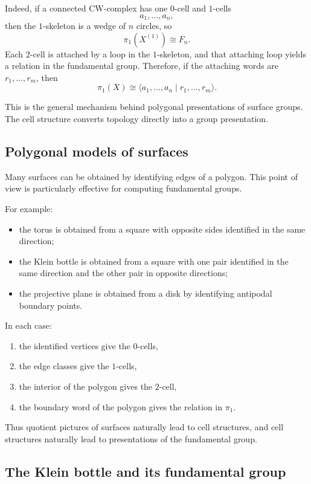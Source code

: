 \documentclass[12pt,a4paper]{article}
\theoremstyle{notespace}
\begin{document}
Indeed, if a connected CW-complex has one \(0\)-cell and \(1\)-cells
\[
a_1,\dots,a_n,
\]
then the \(1\)-skeleton is a wedge of \(n\) circles, so
\[
\pi_1(X^{(1)})\cong F_n.
\]
Each \(2\)-cell is attached by a loop in the \(1\)-skeleton, and that attaching loop yields a relation in the fundamental group. Therefore, if the attaching words are \(r_1,\dots,r_m\), then
\[
\pi_1(X)\cong \langle a_1,\dots,a_n \mid r_1,\dots,r_m\rangle.
\]

This is the general mechanism behind polygonal presentations of surface groups. The cell structure converts topology directly into a group presentation.

\subsection{Polygonal models of surfaces}

Many surfaces can be obtained by identifying edges of a polygon. This point of view is particularly effective for computing fundamental groups.

For example:

\begin{itemize}
	\item the torus is obtained from a square with opposite sides identified in the same direction;
	\item the Klein bottle is obtained from a square with one pair identified in the same direction and the other pair in opposite directions;
	\item the projective plane is obtained from a disk by identifying antipodal boundary points.
\end{itemize}

In each case:

\begin{enumerate}
	\item the identified vertices give the \(0\)-cells,
	\item the edge classes give the \(1\)-cells,
	\item the interior of the polygon gives the \(2\)-cell,
	\item the boundary word of the polygon gives the relation in \(\pi_1\).
\end{enumerate}

Thus quotient pictures of surfaces naturally lead to cell structures, and cell structures naturally lead to presentations of the fundamental group.

\subsection{The Klein bottle and its fundamental group}
\end{document}
